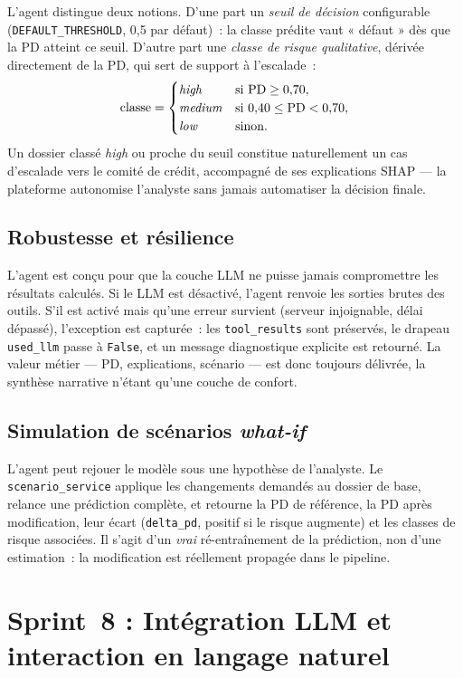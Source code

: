 \documentclass[a4paper,12pt,oneside]{report}
\begin{document}
L'agent distingue deux notions. D'une part un \emph{seuil de décision} configurable
(\texttt{DEFAULT\_THRESHOLD}, 0{,}5 par défaut)~: la classe prédite vaut « défaut » dès que la
PD atteint ce seuil. D'autre part une \emph{classe de risque qualitative}, dérivée
directement de la PD, qui sert de support à l'escalade~:
\[
\text{classe} =
\begin{cases}
\text{\textit{high}}   & \text{si } \text{PD} \geq 0{,}70,\\
\text{\textit{medium}} & \text{si } 0{,}40 \leq \text{PD} < 0{,}70,\\
\text{\textit{low}}    & \text{sinon.}
\end{cases}
\]
Un dossier classé \textit{high} ou proche du seuil constitue naturellement un cas d'escalade
vers le comité de crédit, accompagné de ses explications SHAP — la plateforme autonomise
l'analyste sans jamais automatiser la décision finale.

\subsection{Robustesse et résilience}

L'agent est conçu pour que la couche LLM ne puisse jamais compromettre les résultats calculés.
Si le LLM est désactivé, l'agent renvoie les sorties brutes des outils. S'il est activé mais
qu'une erreur survient (serveur injoignable, délai dépassé), l'exception est capturée~: les
\texttt{tool\_results} sont préservés, le drapeau \texttt{used\_llm} passe à \texttt{False}, et
un message diagnostique explicite est retourné. La valeur métier — PD, explications, scénario —
est donc toujours délivrée, la synthèse narrative n'étant qu'une couche de confort.

\subsection{Simulation de scénarios \textit{what-if}}

L'agent peut rejouer le modèle sous une hypothèse de l'analyste. Le \texttt{scenario\_service}
applique les changements demandés au dossier de base, relance une prédiction complète, et
retourne la PD de référence, la PD après modification, leur écart (\texttt{delta\_pd}, positif
si le risque augmente) et les classes de risque associées. Il s'agit d'un \emph{vrai}
ré-entraînement de la prédiction, non d'une estimation~: la modification est réellement propagée
dans le pipeline.

\section{Sprint~8 : Intégration LLM et interaction en langage naturel}
\end{document}
